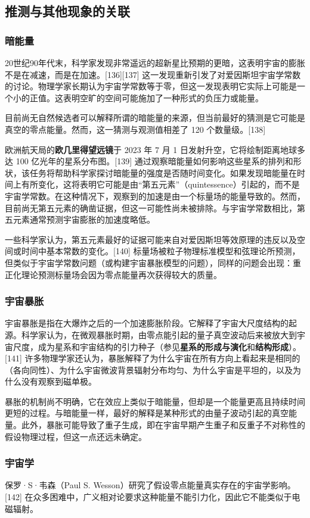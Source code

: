 \subsection{推测与其他现象的关联} 
\subsubsection{暗能量}
20世纪90年代末，科学家发现非常遥远的超新星比预期的更暗，这表明宇宙的膨胀不是在减速，而是在加速。[136][137] 这一发现重新引发了对爱因斯坦宇宙学常数的讨论。物理学家长期认为宇宙学常数等于零，但这一发现表明它实际上可能是一个小的正值。这表明空旷的空间可能施加了一种形式的负压力或能量。

目前尚无自然候选者可以解释所谓的暗能量的来源，但当前最好的猜测是它可能是真空的零点能量。然而，这一猜测与观测值相差了 120 个数量级。[138]  

欧洲航天局的\textbf{欧几里得望远镜}于 2023 年 7 月 1 日发射升空，它将绘制距离地球多达 100 亿光年的星系分布图。[139] 通过观察暗能量如何影响这些星系的排列和形状，该任务将帮助科学家探讨暗能量的强度是否随时间变化。如果发现暗能量在时间上有所变化，这将表明它可能是由“第五元素”（quintessence）引起的，而不是宇宙学常数。在这种情况下，观察到的加速是由一个标量场的能量导致的。然而，目前尚无第五元素的确凿证据，但这一可能性尚未被排除。与宇宙学常数相比，第五元素通常预测宇宙膨胀的加速度略低。

一些科学家认为，第五元素最好的证据可能来自对爱因斯坦等效原理的违反以及空间或时间中基本常数的变化。[140] 标量场被粒子物理标准模型和弦理论所预测，但类似于宇宙学常数问题（或构建宇宙暴胀模型的问题），同样的问题会出现：重正化理论预测标量场会因为零点能量再次获得较大的质量。
\subsubsection{宇宙暴胀}  
宇宙暴胀是指在大爆炸之后的一个加速膨胀阶段。它解释了宇宙大尺度结构的起源。科学家认为，在微观暴胀时期，由零点能引起的量子真空波动后来被放大到宇宙尺度，成为星系和宇宙结构的引力种子（参见\textbf{星系的形成与演化}和\textbf{结构形成}）。[141] 许多物理学家还认为，暴胀解释了为什么宇宙在所有方向上看起来是相同的（各向同性）、为什么宇宙微波背景辐射分布均匀、为什么宇宙是平坦的，以及为什么没有观察到磁单极。

暴胀的机制尚不明确，它在效应上类似于暗能量，但却是一个能量更高且持续时间更短的过程。与暗能量一样，最好的解释是某种形式的由量子波动引起的真空能量。此外，暴胀可能导致了重子生成，即在宇宙早期产生重子和反重子不对称性的假设物理过程，但这一点还远未确定。
\subsubsection{宇宙学}
保罗·S·韦森（Paul S. Wesson）研究了假设零点能量真实存在的宇宙学影响。[142] 在众多困难中，广义相对论要求这种能量不能引力化，因此它不能类似于电磁辐射。
